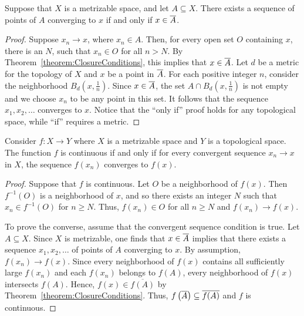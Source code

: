 \begin{theorem}
Suppose that $X$ is a metrizable space, and let $A \subseteq X$.
There exists a sequence of points of $A$ converging to $x$ if and only if $x \in \overline{A}$.
\end{theorem}
\begin{proof}
Suppose $x_n \rightarrow x$, where $x_n \in A$.
Then, for every open set $O$ containing $x$, there is an $N$, such that $x_n \in O$ for all $n>N$.
By Theorem~\ref{theorem:ClosureConditions}, this implies that $x \in \overline{A}$.
Let $d$ be a metric for the topology of $X$ and $x$ be a point in $\overline{A}$.
For each positive integer $n$, consider the neighborhood $B_d \left( x, \frac{1}{n} \right)$.
Since $x\in \overline{A}$, the set $A \cap B_d \left( x, \frac{1}{n} \right)$ is not empty and we choose $x_n$ to be any point in this set.
It follows that the sequence $x_1, x_2, \ldots$ converges to $x$.
Notice that the ``only if'' proof holds for any topological space, while ``if'' requires a metric.
\end{proof}

\begin{theorem}
\label{theorem:topology_limitpoint_closure}
Consider $f:X\to Y$ where $X$ is a metrizable space and $Y$ is a topological space.
The function $f$ is continuous if and only if for every convergent sequence $x_n \rightarrow x$ in $X$, the sequence $f(x_n)$ converges to $f(x)$.
\end{theorem}
\begin{proof}
Suppose that $f$ is continuous.
Let $O$ be a neighborhood of $f(x)$.
Then $f^{-1}(O)$ is a neighborhood of $x$, and so there exists an integer $N$ such that $x_n \in f^{-1}(O)$ for $n \geq N$.
Thus, $f(x_n) \in O$ for all $n \geq N$ and $f(x_n) \rightarrow f(x)$.

To prove the converse, assume that the convergent sequence condition is true.
Let $A \subseteq X$.
Since $X$ is metrizable, one finds that $x \in \overline{A}$ implies that there exists a sequence $x_1, x_2, \ldots$ of points of $A$ converging to $x$.
By assumption, $f(x_n) \rightarrow f(x)$.
Since every neighborhood of $f(x)$ contains all sufficiently large $f(x_n)$ and each $f(x_n)$ belongs to $f(A)$, every neighborhood of $f(x)$ intersects $f(A)$.
Hence, $f(x)\in\overline{f(A)}$ by Theorem~\ref{theorem:ClosureConditions}.
Thus, $f \left( \overline{A} \right) \subseteq \overline{f(A)}$ and $f$ is continuous.
\end{proof}
